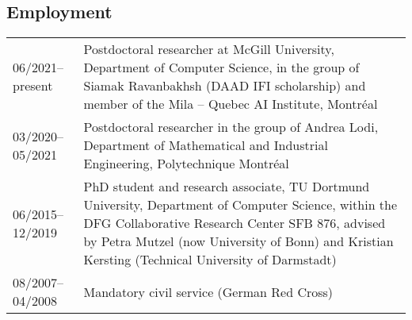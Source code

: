 \documentclass[11pt, a4paper, DIV=12]{scrartcl}
\begin{document}
\subsection*{Employment}
\begin{tabular}{p{3.0cm}p{11.5cm}}
	06/2021--present& Postdoctoral researcher at McGill University, Department of Computer Science, in the group of Siamak Ravanbakhsh (DAAD IFI scholarship) and member of the Mila -- Quebec AI Institute, Montréal\\
	03/2020--05/2021& Postdoctoral researcher in the group of Andrea Lodi, Department of Mathematical and Industrial Engineering, Polytechnique Montréal\\
	06/2015--12/2019&PhD student and research associate, TU Dortmund University, Department of Computer Science, within the DFG Collaborative Research Center SFB 876, advised by Petra Mutzel (now University of Bonn) and Kristian Kersting (Technical University of Darmstadt)\\
	08/2007--04/2008&Mandatory civil service (German Red Cross)\\
\end{tabular}

\renewcommand{\refname}{\large\bfseries Publications}
\end{document}
